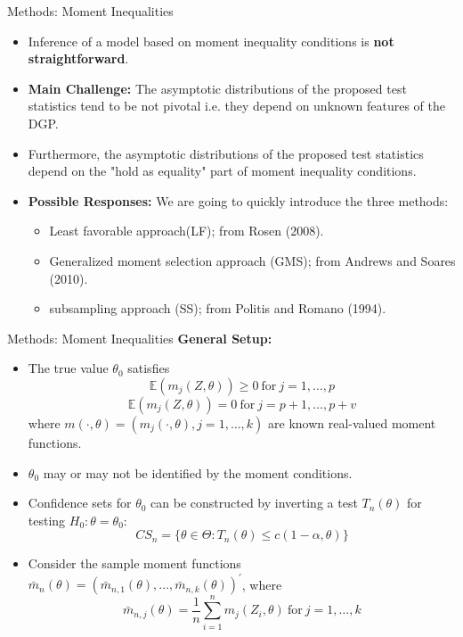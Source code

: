 \documentclass[aspectratio=169]{beamer}  %
\begin{document}
\begin{frame}{Methods: Moment Inequalities}
    \begin{itemize}
        \item Inference of a model based on moment inequality conditions is \textbf{ not straightforward}.
        \item \textbf{Main Challenge:} The asymptotic distributions of the proposed test statistics tend to be not pivotal i.e. they depend on unknown features of the DGP.
        \item Furthermore, the asymptotic distributions of the proposed test statistics depend on the "hold as equality" part of moment inequality conditions.
        \item \textbf{Possible Responses:} We are going to quickly introduce the three methods:
        \begin{itemize}
            \item Least favorable approach(LF); from Rosen (2008).
            \item Generalized moment selection approach (GMS); from Andrews and Soares (2010).
            \item subsampling approach (SS); from Politis and Romano (1994).
        \end{itemize}
    \end{itemize}
\end{frame}

\begin{frame}{Methods: Moment Inequalities}
    \textbf{General Setup:}
    \begin{itemize}
        \item The true value $\theta_0$ satisfies $$\mathbb{E}(m_j(Z,\theta))\geq0\mathrm{~for~}j=1,\ldots,p$$ $$\mathbb{E}(m_j(Z,\theta))=0\mathrm{~for~}j=p+1,\ldots,p+v$$ where $m(\cdot,\theta)=(m_j(\cdot,\theta),j=1,\ldots,k)$ are known real-valued moment
        functions.
        \item $\theta_0$ may or may not be identified by the moment conditions.
        \item Confidence sets for $\theta_0$ can be constructed by inverting a test $T_n(\theta)$ for testing $H_0:\theta=\theta_0:$
        $$CS_n=\{\theta\in\Theta:T_n(\theta)\leq c(1-\alpha,\theta)\}$$
        \item Consider the sample moment functions $\bar{m}_n(\theta)=(\bar{m}_{n,1}(\theta),\ldots,\bar{m}_{n,k}(\theta))^{\prime}$, where $$\bar{m}_{n,j}(\theta)=\frac{1}{n}\sum_{i=1}^nm_j(Z_i,\theta)\mathrm{~for~}j=1,\ldots,k$$
    \end{itemize}
\end{frame}
\end{document}
